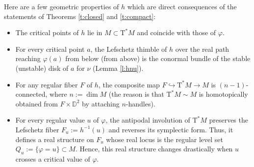 \documentclass[JEP,XML,SOM,Unicode]{cedram}
\newcommand{\D}{{\mathbb D}}
\newcommand{\sT}{\mathrm{T}^\ast}
\newcommand{\de}{\mathrel{:=}}
\let\into\hookrightarrow
\theoremstyle{plain}
\theoremstyle{definition}
\begin{document}
Here are a few geometric properties of $h$ which are direct consequences of the
statements of Theorems \ref{t:closed} and \ref{t:compact}:
\begin{itemize}
\item
The critical points of $h$ lie in $M \subset \sT M$ and coincide with those of
$\varphi$.
\item
For every critical point $a$, the Lefschetz thimble of $h$ over the real path
reaching $\varphi(a)$ from below (\resp from above) is the conormal bundle of
the stable (\resp unstable) disk of $a$ for $\nu$ (\cf Lemma \ref{l:hnu}).
\item
For any regular fiber $F$ of $h$, the composite map $F \into \sT M \to M$ is
$(n-1)$-connected, where $n \de \dim M$ (the reason is that $\sT M \sim M$ is
homotopically obtained from $F \times \D^2$ by attaching $n$-handles).
\item
For every regular value $u$ of $\varphi$, the antipodal involution of $\sT M$
preserves the Lefschetz fiber $F_u \de h^{-1}(u)$ and reverses its symplectic
form. Thus, it defines a real structure on $F_u$ whose real locus is the regular
level set $Q_u \de \{\varphi=u\} \subset M$. Hence, this real structure changes
drastically when $u$ crosses a critical value of $\varphi$.
\end{itemize}
\end{document}
